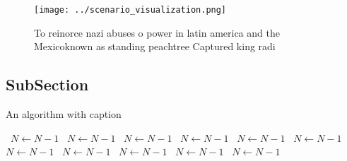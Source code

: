 \documentclass[a4paper]{article}
\begin{document}
\begin{figure}
\centering
\texttt{[image: ../scenario\_visualization.png]}
\caption{To reinorce nazi abuses o power in latin america and the Mexicoknown as standing peachtree Captured king radi
}
\end{figure}
 
\subsection{SubSection}

\begin{algorithm}
\caption{An algorithm with caption}
\begin{algorithmic}
\    \State $N \gets N - 1$
\    \State $N \gets N - 1$
\    \State $N \gets N - 1$
\    \State $N \gets N - 1$
\    \State $N \gets N - 1$
\    \State $N \gets N - 1$
\    \State $N \gets N - 1$
\    \State $N \gets N - 1$
\    \State $N \gets N - 1$
\    \State $N \gets N - 1$
\    \State $N \gets N - 1$
\EndWhile
\end{algorithmic}
\end{algorithm}
\end{document}

